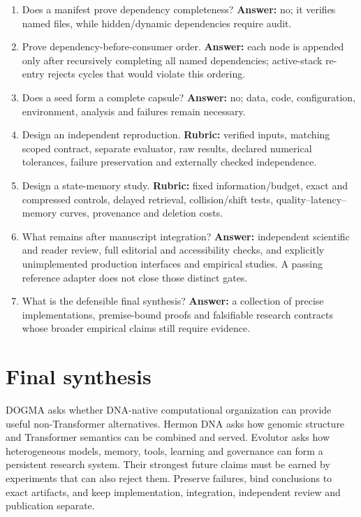 \begin{enumerate}
identity changed; the old review cannot certify the new bytes.
\item Does a manifest prove dependency completeness? \textbf{Answer:} no;
it verifies named files, while hidden/dynamic dependencies require audit.
\item Prove dependency-before-consumer order. \textbf{Answer:} each node is
appended only after recursively completing all named dependencies; active-stack
re-entry rejects cycles that would violate this ordering.
\item Does a seed form a complete capsule? \textbf{Answer:} no; data, code,
configuration, environment, analysis and failures remain necessary.
\item Design an independent reproduction. \textbf{Rubric:} verified inputs,
matching scoped contract, separate evaluator, raw results, declared numerical
tolerances, failure preservation and externally checked independence.
\item Design a state-memory study. \textbf{Rubric:} fixed information/budget,
exact and compressed controls, delayed retrieval, collision/shift tests,
quality--latency--memory curves, provenance and deletion costs.
\item What remains after manuscript integration? \textbf{Answer:} independent
scientific and reader review, full editorial and accessibility checks, and
explicitly unimplemented production interfaces and empirical studies. A passing
reference adapter does not close those distinct gates.
\item What is the defensible final synthesis? \textbf{Answer:} a collection
of precise implementations, premise-bound proofs and falsifiable research
contracts whose broader empirical claims still require evidence.
\end{enumerate}

\section{Final synthesis}
DOGMA asks whether DNA-native computational organization can provide useful
non-Transformer alternatives. Hermon DNA asks how genomic structure and
Transformer semantics can be combined and served. Evolutor asks how heterogeneous
models, memory, tools, learning and governance can form a persistent research
system. Their strongest future claims must be earned by experiments that can
also reject them. Preserve failures, bind conclusions to exact artifacts, and
keep implementation, integration, independent review and publication separate.
